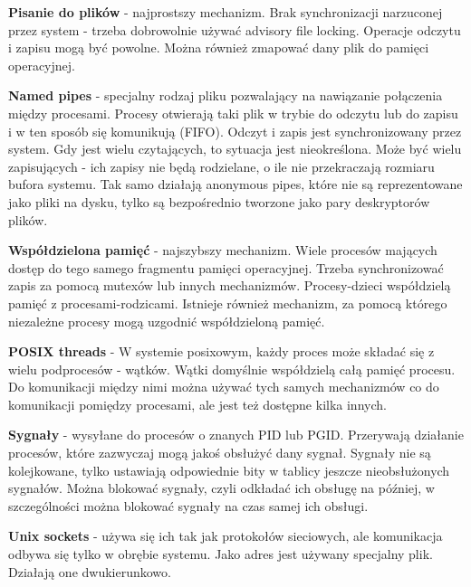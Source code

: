 \textbf{Pisanie do plików} - najprostszy mechanizm. Brak synchronizacji narzuconej przez system - trzeba dobrowolnie używać advisory file locking. Operacje odczytu i zapisu mogą być powolne. Można również zmapować dany plik do pamięci operacyjnej.

\textbf{Named pipes} - specjalny rodzaj pliku  pozwalający na nawiązanie połączenia między procesami. Procesy otwierają taki plik w trybie do odczytu lub do zapisu i w ten sposób się komunikują (FIFO). Odczyt i zapis jest synchronizowany przez system. Gdy jest wielu czytających, to sytuacja jest nieokreślona. Może być wielu zapisujących - ich zapisy nie będą rodzielane, o ile nie przekraczają rozmiaru bufora systemu. Tak samo działają anonymous pipes, które nie są reprezentowane jako pliki na dysku, tylko są bezpośrednio tworzone jako pary deskryptorów plików.

\textbf{Współdzielona pamięć} - najszybszy mechanizm. Wiele procesów mających dostęp do tego samego fragmentu pamięci operacyjnej. Trzeba synchronizować zapis za pomocą mutexów lub innych mechanizmów. Procesy-dzieci współdzielą pamięć z procesami-rodzicami. Istnieje również mechanizm, za pomocą którego niezależne procesy mogą uzgodnić współdzieloną pamięć.

\textbf{POSIX threads} - W systemie posixowym, każdy proces może składać się z wielu podprocesów - wątków. Wątki domyślnie współdzielą całą pamięć procesu. Do komunikacji między nimi można używać tych samych mechanizmów co do komunikacji pomiędzy procesami, ale jest też dostępne kilka innych. 

\textbf{Sygnały} - wysyłane do procesów o znanych PID lub PGID. Przerywają działanie procesów, które zazwyczaj mogą jakoś obsłużyć dany sygnał. Sygnały nie są kolejkowane, tylko ustawiają odpowiednie bity w tablicy jeszcze nieobsłużonych sygnałów. Można blokować sygnały, czyli odkładać ich obsługę na później, w szczególności można blokować sygnały na czas samej ich obsługi.

\textbf{Unix sockets} - używa się ich tak jak protokołów sieciowych, ale komunikacja odbywa się tylko w obrębie systemu. Jako adres jest używany specjalny plik. Działają one dwukierunkowo.
